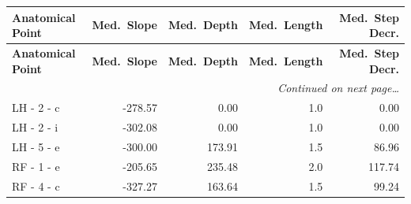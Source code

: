\documentclass[a4paper,11pt]{article}
\begin{document}
\begin{small}
\begin{longtable}{p{4.5cm}rrrr}
\toprule
\textbf{Anatomical Point} &
\textbf{Med.\ Slope} &
\textbf{Med.\ Depth} &
\textbf{Med.\ Length} &
\textbf{Med.\ Step Decr.} \\
\midrule
\endfirsthead
\toprule
\textbf{Anatomical Point} &
\textbf{Med.\ Slope} &
\textbf{Med.\ Depth} &
\textbf{Med.\ Length} &
\textbf{Med.\ Step Decr.} \\
\midrule
\endhead
\midrule
\multicolumn{5}{r}{\small\emph{Continued on next page\ldots}} \\
\endfoot
\bottomrule
\endlastfoot
LH - 2 - c & -278.57 & 0.00 & 1.0 & 0.00 \\
LH - 2 - i & -302.08 & 0.00 & 1.0 & 0.00 \\
LH - 5 - e & -300.00 & 173.91 & 1.5 & 86.96 \\
RF - 1 - e & -205.65 & 235.48 & 2.0 & 117.74 \\
RF - 4 - c & -327.27 & 163.64 & 1.5 & 99.24 \\
\end{longtable}
\end{small}
\end{document}
